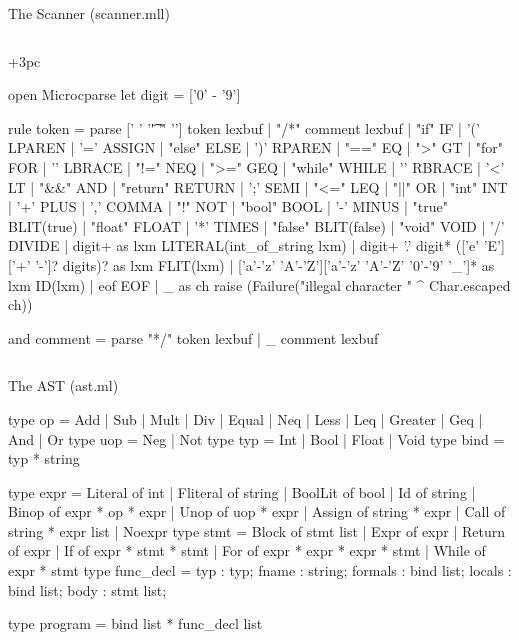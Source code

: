 \documentclass{plt}
\begin{document}
\begin{frame}[fragile=singleslide]{The Scanner (scanner.mll)}

  \begin{columns}
    \begin{column}{\dimexpr\textwidth+3pc}
\begin{ocamllex}
{ open Microcparse }  
let digit = ['0' - '9']

rule token = parse
  [' ' '\t' '\r' '\n'] { token   lexbuf }
| "/*"                 { comment lexbuf }          
| "if"     { IF }     | '(' { LPAREN } | '='  { ASSIGN } 
| "else"   { ELSE }   | ')' { RPAREN } | "==" { EQ }    | ">"  { GT }    
| "for"    { FOR }    | '{' { LBRACE } | "!=" { NEQ }   | ">=" { GEQ }   
| "while"  { WHILE }  | '}' { RBRACE } | '<'  { LT }    | "&&" { AND }   
| "return" { RETURN } | ';' { SEMI }   | "<=" { LEQ }   | "||" { OR }    
| "int"    { INT }    | '+' { PLUS }   | ','  { COMMA } | "!"  { NOT } 
| "bool"   { BOOL }   | '-' { MINUS }  | "true"   { BLIT(true)  }
| "float"  { FLOAT }  | '*' { TIMES }  | "false"  { BLIT(false) }
| "void"   { VOID }   | '/' { DIVIDE }                         
| digit+ as lxm { LITERAL(int_of_string lxm) }
| digit+ '.' digit* (['e' 'E'] ['+' '-']? digits)? as lxm { FLIT(lxm) }
| ['a'-'z' 'A'-'Z']['a'-'z' 'A'-'Z' '0'-'9' '_']*  as lxm { ID(lxm)   }
| eof { EOF }
| _ as ch { raise (Failure("illegal character " ^ Char.escaped ch)) }

and comment = parse
  "*/" { token lexbuf }
| _    { comment lexbuf }
\end{ocamllex}
    \end{column}
  \end{columns}
\end{frame}

\begin{frame}[fragile=singleslide]{The AST (ast.ml)}

\begin{ocaml}
type op   = Add | Sub | Mult | Div | Equal | Neq | Less | Leq
          | Greater | Geq | And | Or
type uop  = Neg | Not
type typ  = Int | Bool | Float | Void
type bind = typ * string

type expr = Literal of int | Fliteral of string | BoolLit of bool
          | Id      of string
          | Binop   of expr * op * expr | Unop of uop * expr
          | Assign  of string * expr
          | Call    of string * expr list
          | Noexpr
type stmt = Block  of stmt list
          | Expr   of expr
          | Return of expr
          | If     of expr * stmt * stmt
          | For    of expr * expr * expr * stmt
          | While  of expr * stmt          
type func_decl = { typ     : typ;
                   fname   : string;
                   formals : bind list;
                   locals  : bind list;
                   body    : stmt list;  }

type program = bind list * func_decl list
\end{ocaml}

\end{frame}
\end{document}
